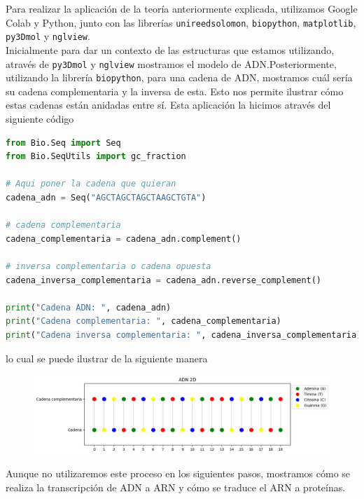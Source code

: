 
Para realizar la aplicación de la teoría anteriormente explicada, utilizamos Google Colab y Python, junto con las librerías \texttt{unireedsolomon}, \texttt{biopython}, \texttt{matplotlib}, \texttt{py3Dmol} y \texttt{nglview}.\\
Inicialmente para dar un contexto de las estructuras que estamos utilizando, através de \texttt{py3Dmol} y \texttt{nglview} mostramos el modelo de ADN.Posteriormente, utilizando la librería \texttt{biopython}, para una cadena de ADN, mostramos cuál sería su cadena complementaria y la inversa de esta. Esto nos permite ilustrar cómo estas cadenas están anidadas entre sí. Esta aplicación la hicimos através del siguiente código 

\begin{lstlisting}[language=Python]
from Bio.Seq import Seq 
from Bio.SeqUtils import gc_fraction

# Aqui poner la cadena que quieran
cadena_adn = Seq("AGCTAGCTAGCTAAGCTGTA")

# cadena complementaria
cadena_complementaria = cadena_adn.complement()

# inversa complementaria o cadena opuesta
cadena_inversa_complementaria = cadena_adn.reverse_complement()

print("Cadena ADN: ", cadena_adn)
print("Cadena complementaria: ", cadena_complementaria)
print("Cadena inversa complementaria: ", cadena_inversa_complementaria)
\end{lstlisting}
lo cual se puede ilustrar de la siguiente manera
\begin{figure}[h]
\centering
        \includegraphics[scale=0.25]{adn1.jpeg} 
    \end{figure}

Aunque no utilizaremos este proceso en los siguientes pasos, mostramos cómo se realiza la transcripción de ADN a ARN y cómo se traduce el ARN a proteínas.

